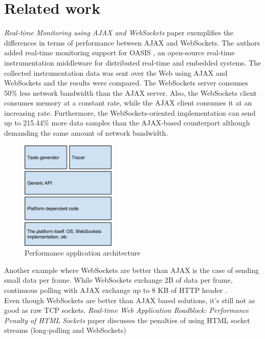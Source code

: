 \documentclass[conference]{IEEEtran}
\begin{document}
\section{Related work}
\textit{Real-time Monitoring using AJAX and WebSockets} paper \cite{RT-Monitoring}
exemplifies the differences in terms of performance between AJAX and WebSockets.
The authors added real-time monitoring support for OASIS \cite{OASIS},
an open-source real-time instrumentation middleware for distributed real-time
and embedded systems. The collected instrumentation data was sent over the Web
using AJAX and WebSockets and the results were compared. The WebSockets server
consumes 50\% less network bandwidth than the AJAX server. Also, the WebSockets
client consumes memory at a constant rate, while the AJAX client consumes it
at an increasing rate. Furthermore, the WebSockets-oriented implementation can
send up to 215.44\% more data samples than the AJAX-based counterpart although
demanding the same amount of network bandwidth.
\\
\begin{frame}{}
  \begin{figure}
    \centering
    \includegraphics[width=0.4\textwidth]{Architecture.png}
    \caption{Performance application architecture}
  \end{figure}
\end{frame}
\indent
Another example where WebSockets are better than AJAX is the case of sending
small data per frame. While WebSockets exchange 2B of data per frame, continuous
polling with AJAX exchange up to 8 KB of HTTP header \cite{2009:Misc}.
\\
\indent
Even though WebSockets are better than AJAX based solutions, it's still not as
good as raw TCP sockets. \textit{Real-time Web Application Roadblock:
Performance Penalty of HTML Sockets} paper \cite{Performance-Penalty} discusses
the penalties of using HTML socket streams (long-polling and WebSockets)
\end{document}
